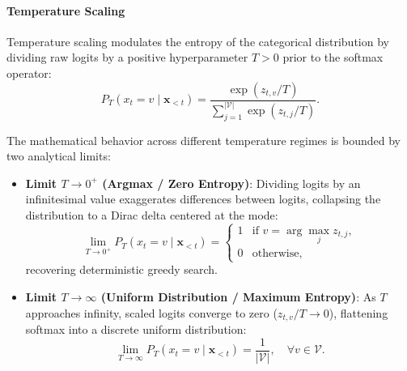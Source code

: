 \documentclass[../../main.tex]{subfiles}
\begin{document}
\paragraph{Temperature Scaling}
Temperature scaling modulates the entropy of the categorical distribution by dividing raw logits by a positive hyperparameter $T > 0$ prior to the softmax operator:
\begin{equation}
P_T(x_t = v \mid \mathbf{x}_{<t}) = \frac{\exp(z_{t,v} / T)}{\sum_{j=1}^{|\mathcal{V}|} \exp(z_{t,j} / T)}.
\label{eq:temperature_softmax}
\end{equation}

The mathematical behavior across different temperature regimes is bounded by two analytical limits:
\begin{itemize}
    \item \textbf{Limit $T \to 0^+$ (Argmax / Zero Entropy)}: Dividing logits by an infinitesimal value exaggerates differences between logits, collapsing the distribution to a Dirac delta centered at the mode:
    \begin{equation}
    \lim_{T \to 0^+} P_T(x_t = v \mid \mathbf{x}_{<t}) = \begin{cases}
    1 & \text{if } v = \arg\max_{j} z_{t,j}, \\
    0 & \text{otherwise},
    \end{cases}
    \label{eq:temperature_zero_limit}
    \end{equation}
    recovering deterministic greedy search.
    
    \item \textbf{Limit $T \to \infty$ (Uniform Distribution / Maximum Entropy)}: As $T$ approaches infinity, scaled logits converge to zero ($z_{t,v}/T \to 0$), flattening softmax into a discrete uniform distribution:
    \begin{equation}
    \lim_{T \to \infty} P_T(x_t = v \mid \mathbf{x}_{<t}) = \frac{1}{|\mathcal{V}|}, \quad \forall v \in \mathcal{V}.
    \label{eq:temperature_inf_limit}
    \end{equation}
\end{itemize}
\end{document}
